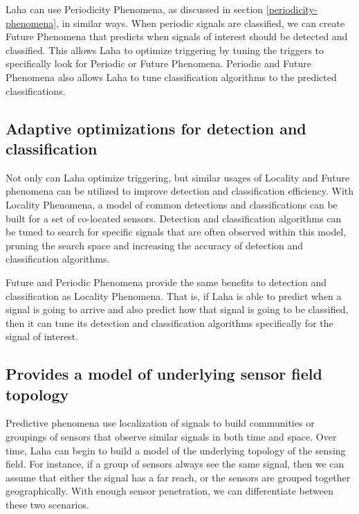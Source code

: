 Laha can use Periodicity Phenomena, as discussed in section \ref{periodicity-phenomena}, in similar ways. When periodic signals are classified, we can create Future Phenomena that predicts when signals of interest should be detected and classified. This allows Laha to optimize triggering by tuning the triggers to specifically look for Periodic or Future Phenomena. Periodic and Future Phenomena also allows Laha to tune classification algorithms to the predicted classifications.

\subsection{Adaptive optimizations for detection and classification}
Not only can Laha optimize triggering, but similar usages of Locality and Future phenomena can be utilized to improve detection and classification efficiency. With Locality Phenomena, a model of common detections and classifications can be built for a set of co-located sensors. Detection and classification algorithms can be tuned to search for specific signals that are often observed within this model, pruning the search space and increasing the accuracy of detection and classification algorithms.

Future and Periodic Phenomena provide the same benefits to detection and classification as Locality Phenomena. That is, if Laha is able to predict when a signal is going to arrive and also predict how that signal is going to be classified, then it can tune its detection and classification algorithms specifically for the signal of interest.

\subsection{Provides a model of underlying sensor field topology}

Predictive phenomena use localization of signals to build communities or groupings of sensors that observe similar signals in both time and space. Over time, Laha can begin to build a model of the underlying topology of the sensing field. For instance, if a group of sensors always see the same signal, then we can assume that either the signal has a far reach, or the sensors are grouped together geographically. With enough sensor penetration, we can differentiate between these two scenarios.

